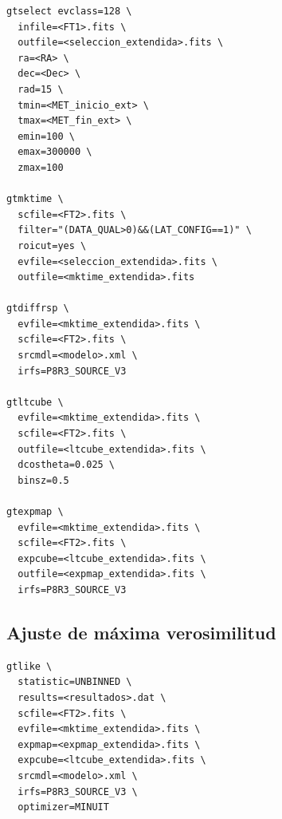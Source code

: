 \begin{lstlisting}[style=mipython]
gtselect evclass=128 \
  infile=<FT1>.fits \
  outfile=<seleccion_extendida>.fits \
  ra=<RA> \
  dec=<Dec> \
  rad=15 \
  tmin=<MET_inicio_ext> \
  tmax=<MET_fin_ext> \
  emin=100 \
  emax=300000 \
  zmax=100

gtmktime \
  scfile=<FT2>.fits \
  filter="(DATA_QUAL>0)&&(LAT_CONFIG==1)" \
  roicut=yes \
  evfile=<seleccion_extendida>.fits \
  outfile=<mktime_extendida>.fits

gtdiffrsp \
  evfile=<mktime_extendida>.fits \
  scfile=<FT2>.fits \
  srcmdl=<modelo>.xml \
  irfs=P8R3_SOURCE_V3

gtltcube \
  evfile=<mktime_extendida>.fits \
  scfile=<FT2>.fits \
  outfile=<ltcube_extendida>.fits \
  dcostheta=0.025 \
  binsz=0.5

gtexpmap \
  evfile=<mktime_extendida>.fits \
  scfile=<FT2>.fits \
  expcube=<ltcube_extendida>.fits \
  outfile=<expmap_extendida>.fits \
  irfs=P8R3_SOURCE_V3
\end{lstlisting}

\subsection{Ajuste de máxima verosimilitud}
\label{an:gtlike}

\begin{lstlisting}[style=mipython]
gtlike \
  statistic=UNBINNED \
  results=<resultados>.dat \
  scfile=<FT2>.fits \
  evfile=<mktime_extendida>.fits \
  expmap=<expmap_extendida>.fits \
  expcube=<ltcube_extendida>.fits \
  srcmdl=<modelo>.xml \
  irfs=P8R3_SOURCE_V3 \
  optimizer=MINUIT
\end{lstlisting}
